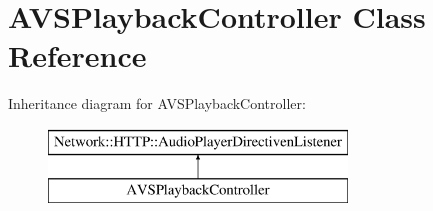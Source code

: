 \hypertarget{classAVSPlaybackController}{}\section{A\+V\+S\+Playback\+Controller Class Reference}
\label{classAVSPlaybackController}
Inheritance diagram for A\+V\+S\+Playback\+Controller\+:\begin{figure}[H]
\begin{center}
\leavevmode
\includegraphics[height=2.000000cm]{dd/dca/classAVSPlaybackController}
\end{center}
\end{figure}

